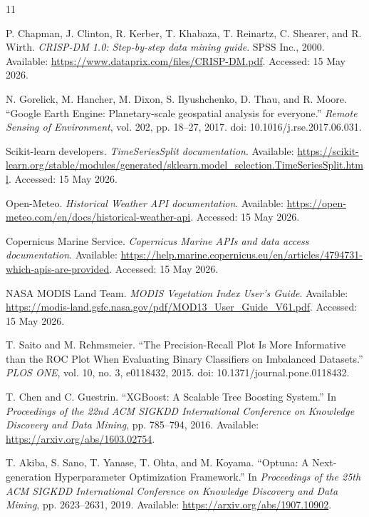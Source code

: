 \documentclass[a4paper, 11pt]{article}
\begin{document}
\footnotesize
\begin{thebibliography}{11}
\setlength{\itemsep}{0pt}
\setlength{\parsep}{0pt}

P. Chapman, J. Clinton, R. Kerber, T. Khabaza, T. Reinartz, C. Shearer, and R. Wirth.
\textit{CRISP-DM 1.0: Step-by-step data mining guide}. SPSS Inc., 2000.
Available: \url{https://www.dataprix.com/files/CRISP-DM.pdf}. Accessed: 15 May 2026.

N. Gorelick, M. Hancher, M. Dixon, S. Ilyushchenko, D. Thau, and R. Moore.
``Google Earth Engine: Planetary-scale geospatial analysis for everyone.''
\textit{Remote Sensing of Environment}, vol. 202, pp. 18--27, 2017.
doi: 10.1016/j.rse.2017.06.031.

Scikit-learn developers.
\textit{TimeSeriesSplit documentation}.
Available: \url{https://scikit-learn.org/stable/modules/generated/sklearn.model_selection.TimeSeriesSplit.html}. Accessed: 15 May 2026.

Open-Meteo.
\textit{Historical Weather API documentation}.
Available: \url{https://open-meteo.com/en/docs/historical-weather-api}. Accessed: 15 May 2026.

Copernicus Marine Service.
\textit{Copernicus Marine APIs and data access documentation}.
Available: \url{https://help.marine.copernicus.eu/en/articles/4794731-which-apis-are-provided}. Accessed: 15 May 2026.

NASA MODIS Land Team.
\textit{MODIS Vegetation Index User's Guide}.
Available: \url{https://modis-land.gsfc.nasa.gov/pdf/MOD13_User_Guide_V61.pdf}. Accessed: 15 May 2026.

T. Saito and M. Rehmsmeier.
``The Precision-Recall Plot Is More Informative than the ROC Plot When Evaluating Binary Classifiers on Imbalanced Datasets.''
\textit{PLOS ONE}, vol. 10, no. 3, e0118432, 2015.
doi: 10.1371/journal.pone.0118432.

T. Chen and C. Guestrin.
``XGBoost: A Scalable Tree Boosting System.''
In \textit{Proceedings of the 22nd ACM SIGKDD International Conference on Knowledge Discovery and Data Mining}, pp. 785--794, 2016.
Available: \url{https://arxiv.org/abs/1603.02754}.

T. Akiba, S. Sano, T. Yanase, T. Ohta, and M. Koyama.
``Optuna: A Next-generation Hyperparameter Optimization Framework.''
In \textit{Proceedings of the 25th ACM SIGKDD International Conference on Knowledge Discovery and Data Mining}, pp. 2623--2631, 2019.
Available: \url{https://arxiv.org/abs/1907.10902}.


\end{thebibliography}
\end{document}
